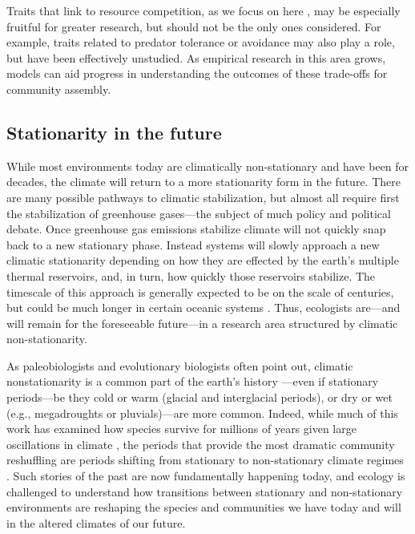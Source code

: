 \documentclass[11pt,letterpaper]{article}
\newcommand{\R}[1]{\label{#1}\linelabel{#1}}
\begin{document}
Traits that link to resource competition, as we focus on here \citep[as others have as well, see][]{volkerass}, may be especially fruitful for greater research, but should not be the only ones considered. For example, traits related to predator tolerance or avoidance may also play a role, but have been effectively unstudied.  As empirical research in this area grows, models can aid progress in understanding the outcomes of these trade-offs for community assembly. \\ 


\subsection{Stationarity in the future}
While most environments today are climatically non-stationary and have been for decades, the climate will return to a more stationarity form in the future. There are many possible pathways to climatic stabilization, but almost all require first the stabilization of greenhouse gases---the subject of much policy and political debate. Once greenhouse gas emissions stabilize climate will not quickly snap back to a new stationary phase. Instead systems will slowly approach a new climatic stationarity depending on how they are effected by the earth's multiple thermal reservoirs, and, in turn, how quickly those reservoirs stabilize. The timescale of this approach is generally expected to be on the scale of centuries, but could be much longer in certain oceanic systems \citep{ipcc2013ch12}. Thus, ecologists are---and will remain for the foreseeable future---in a research area structured by climatic non-stationarity. 

As paleobiologists and evolutionary biologists often point out, climatic nonstationarity is a common part of the earth's history \citep{Jansson:2002nz}---even if stationary periods---be they cold or warm (glacial and interglacial periods), or dry or wet (e.g., megadroughts or pluvials)\R{r2precip1}---are more common. Indeed, while much of this work has examined how species survive for millions of years given large oscillations in climate \citep{provan2008}, the periods that provide the most dramatic community reshuffling are periods shifting from stationary to non-stationary climate regimes \citep{vrba1980,vrba1985}. Such stories of the past are now fundamentally happening today, and ecology is challenged to understand how transitions between stationary and non-stationary environments are reshaping the species and communities we have today and will in the altered climates of our future.\R{r2precip2}
\end{document}
